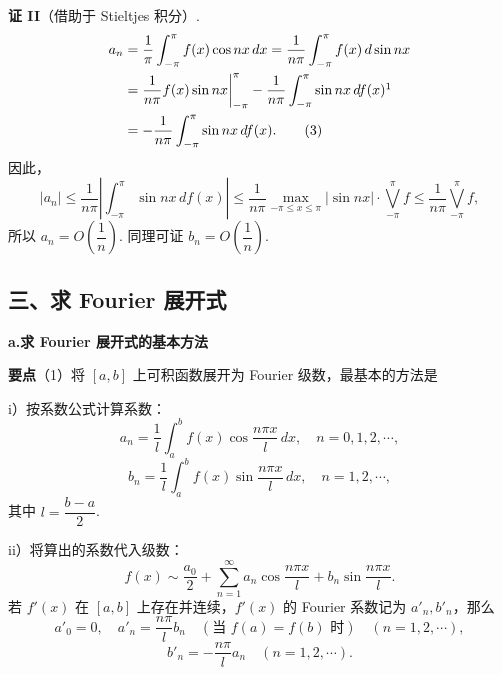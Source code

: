 \documentclass[UTF8, 12pt, fontset=fandol, oneside]{ctexart}
\begin{document}
\noindent\textbf{证 II}\quad （借助于 Stieltjes 积分）.
\[
\begin{aligned}
a_n&=\frac1\pi\int_{-\pi}^{\pi}f(x)\cos nx\,dx
=\frac1{n\pi}\int_{-\pi}^{\pi}f(x)\,d\sin nx\\
&=\frac1{n\pi}f(x)\sin nx\bigg|_{-\pi}^{\pi}
-\frac1{n\pi}\int_{-\pi}^{\pi}\sin nx\,df(x)\footnotemark\\
&=-\frac1{n\pi}\int_{-\pi}^{\pi}\sin nx\,df(x). \qquad(3)
\end{aligned}
\]
因此，
\[
  |a_n|\le\frac1{n\pi}\left|\int_{-\pi}^{\pi}\sin nx\,df(x)\right|
  \le\frac1{n\pi}\max_{-\pi\le x\le\pi}|\sin nx|\cdot\bigvee_{-\pi}^{\pi}f
  \le\frac1{n\pi}\bigvee_{-\pi}^{\pi}f,
\]
所以 $a_n=O\left(\dfrac1n\right)$. 同理可证 $b_n=O\left(\dfrac1n\right)$.


\subsection*{三、求 Fourier 展开式}

\noindent\textbf{a.\quad 求 Fourier 展开式的基本方法}

\noindent\textbf{要点}\quad （1）将 $[a,b]$ 上可积函数展开为 Fourier 级数，最基本的方法是

i）按系数公式计算系数：
\[
  a_n=\frac1l\int_a^b f(x)\cos\frac{n\pi x}{l}\,dx,\quad n=0,1,2,\cdots,
\]
\[
  b_n=\frac1l\int_a^b f(x)\sin\frac{n\pi x}{l}\,dx,\quad n=1,2,\cdots,
\]
其中 $l=\dfrac{b-a}{2}$.

ii）将算出的系数代入级数：
\[
  f(x)\sim\frac{a_0}2+\sum_{n=1}^{\infty}a_n\cos\frac{n\pi x}{l}
  +b_n\sin\frac{n\pi x}{l}.
\]
若 $f'(x)$ 在 $[a,b]$ 上存在并连续，$f'(x)$ 的 Fourier 系数记为 $a'_n,b'_n$，那么
\[
  a'_0=0,\quad a'_n=\frac{n\pi}{l}b_n\quad(\text{当 }f(a)=f(b)\text{ 时})\quad(n=1,2,\cdots),
\]
\[
  b'_n=-\frac{n\pi}{l}a_n\quad(n=1,2,\cdots).
\]
\end{document}

